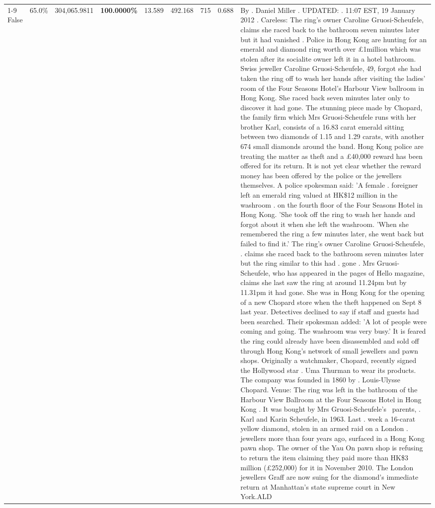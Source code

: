 \begin{table}[H]
\begin{tabular}{lllrlllll}
\cline{1-9}
False & 65.0\% & 304,065.9811 & \bfseries \color{red} 100.0000\% & 13.589 & 492.168 & 715 & 0.688 & By . Daniel Miller . UPDATED: . 11:07 EST, 19 January 2012 . Careless: The ring's owner Caroline Gruosi-Scheufele, claims she raced back to the bathroom seven minutes later but it had vanished . Police in Hong Kong are hunting for an emerald and diamond ring worth over £1million which was stolen after its socialite owner left it in a hotel bathroom. Swiss jeweller Caroline Gruosi-Scheufele, 49, forgot she had taken the ring off to wash her hands after visiting the ladies' room of the Four Seasons Hotel's Harbour View ballroom in Hong Kong. She raced back seven minutes later only to discover it had gone. The stunning piece made by Chopard, the family firm which Mrs Gruosi-Scheufele runs with her brother Karl, consists of a 16.83 carat emerald sitting between two diamonds of 1.15 and 1.29 carats, with another 674 small diamonds around the band. Hong Kong police are treating the matter as theft and a £40,000 reward has been offered for its return. It is not yet clear whether the reward money has been offered by the police or the jewellers themselves. A police spokesman said: 'A female . foreigner left an emerald ring valued at HK\$12 million in the washroom . on the fourth floor of the Four Seasons Hotel in Hong Kong. 'She took off the ring to wash her hands and forgot about it when she left the washroom. 'When she remembered the ring a few minutes later, she went back but failed to find it.' The ring's owner Caroline Gruosi-Scheufele, . claims she raced back to the bathroom seven minutes later but the ring similar to this had . gone . Mrs Gruosi-Scheufele, who has appeared in the pages of Hello magazine, claims she last saw the ring at around 11.24pm but by 11.31pm it had gone. She was in Hong Kong for the opening of a new Chopard store when the theft happened on Sept 8 last year. Detectives declined to say if staff and guests had been searched. Their spokesman added: 'A lot of people were coming and going. The washroom was very busy.' It is feared the ring could already have been disassembled and sold off through Hong Kong's network of small jewellers and pawn shops. Originally a watchmaker, Chopard, recently signed the Hollywood star . Uma Thurman to wear its products. The company was founded in 1860 by . Louis-Ulysse Chopard. Venue: The ring was left in the bathroom of the Harbour View Ballroom at the Four Seasons Hotel in Hong Kong . It was bought by Mrs Gruosi-Scheufele's  parents, . Karl and Karin Scheufele, in 1963. Last . week a 16-carat yellow diamond, stolen in an armed raid on a London . jewellers more than four years ago, surfaced in a Hong Kong pawn shop. The owner of the Yau On pawn shop is refusing to return the item claiming they paid more than HK\$3 million (£252,000) for it in November 2010. The London jewellers Graff are now suing for the diamond’s immediate return at Manhattan’s state supreme court in New York.ALD \\

\end{tabular}
\end{table}
